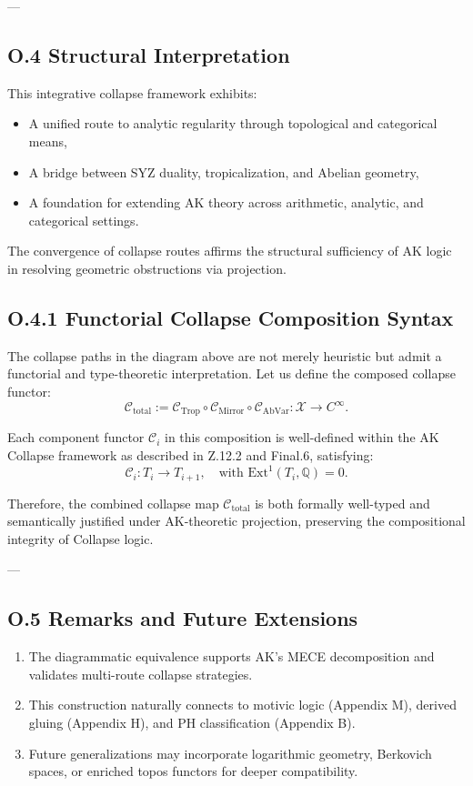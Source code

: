 \documentclass[11pt]{article}
\begin{document}
\begin{axiom}
\begin{axiom}
{{---

\subsection*{O.4 Structural Interpretation}

This integrative collapse framework exhibits:

\begin{itemize}
  \item A unified route to analytic regularity through topological and categorical means,
  \item A bridge between SYZ duality, tropicalization, and Abelian geometry,
  \item A foundation for extending AK theory across arithmetic, analytic, and categorical settings.
\end{itemize}

The convergence of collapse routes affirms the structural sufficiency of AK logic in resolving geometric obstructions via projection.


\subsection*{O.4.1 Functorial Collapse Composition Syntax}

The collapse paths in the diagram above are not merely heuristic but admit a functorial and type-theoretic interpretation.  
Let us define the composed collapse functor:
\[
\mathcal{C}_{\mathrm{total}} := \mathcal{C}_{\mathrm{Trop}} \circ \mathcal{C}_{\mathrm{Mirror}} \circ \mathcal{C}_{\mathrm{AbVar}} : \mathcal{X} \to C^\infty.
\]

Each component functor \( \mathcal{C}_i \) in this composition is well-defined within the AK Collapse framework as described in Z.12.2 and Final.6, satisfying:
\[
\mathcal{C}_i : T_i \to T_{i+1}, \quad \text{with } \mathrm{Ext}^1(T_i, \mathbb{Q}) = 0.
\]

Therefore, the combined collapse map \( \mathcal{C}_{\mathrm{total}} \) is both formally well-typed and semantically justified under AK-theoretic projection, preserving the compositional integrity of Collapse logic.


---


\subsection*{O.5 Remarks and Future Extensions}

\begin{enumerate}
  \item The diagrammatic equivalence supports AK’s MECE decomposition and validates multi-route collapse strategies.
  \item This construction naturally connects to motivic logic (Appendix M), derived gluing (Appendix H), and PH classification (Appendix B).
  \item Future generalizations may incorporate logarithmic geometry, Berkovich spaces, or enriched topos functors for deeper compatibility.
\end{enumerate}


}}
\end{axiom}
\end{axiom}
\end{document}
